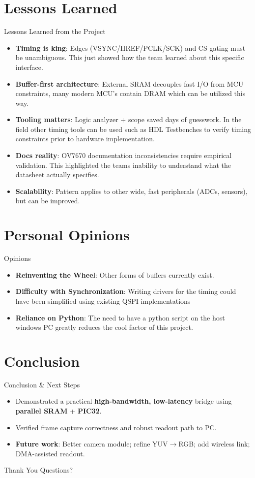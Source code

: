 \documentclass{beamer}
\begin{document}
\section{Lessons Learned}
\begin{frame}{Lessons Learned from the Project}
\begin{itemize}
  \item \textbf{Timing is king}: Edges (VSYNC/HREF/PCLK/SCK) and CS gating must be unambiguous. This just showed how the team learned about this specific interface.
  \item \textbf{Buffer-first architecture}: External SRAM decouples fast I/O from MCU constraints, many modern MCU's contain DRAM which can be utilized this way.
  \item \textbf{Tooling matters}: Logic analyzer + scope saved days of guesswork. In the field other timing tools can be used such as HDL Testbenches to verify timing constraints prior to hardware implementation.
  \item \textbf{Docs reality}: OV7670 documentation inconsistencies require empirical validation. This highlighted the teams inability to understand what the datasheet actually specifies.
  \item \textbf{Scalability}: Pattern applies to other wide, fast peripherals (ADCs, sensors), but can be improved.
\end{itemize}
\end{frame}
\section{Personal Opinions}
\begin{frame}{Opinions}
  \begin{itemize}
    \item \textbf{Reinventing the Wheel}: Other forms of buffers currently exist.
    \item \textbf{Difficulty with Synchronization}: Writing drivers for the timing could have been simplified using existing QSPI implementations
    \item \textbf{Reliance on Python}: The need to have a python script on the host windows PC greatly reduces the cool factor of this project.
    \end{itemize}
  \end{frame}

\section{Conclusion}
\begin{frame}{Conclusion \& Next Steps}
\begin{itemize}
  \item Demonstrated a practical \textbf{high-bandwidth, low-latency} bridge using \textbf{parallel SRAM} + \textbf{PIC32}.
  \item Verified frame capture correctness and robust readout path to PC.
  \item \textbf{Future work}: Better camera module; refine YUV$\rightarrow$RGB; add wireless link; DMA-assisted readout.
\end{itemize}
\end{frame}


\begin{frame}{Thank You}
\centering
Questions?
\end{frame}
\end{document}
